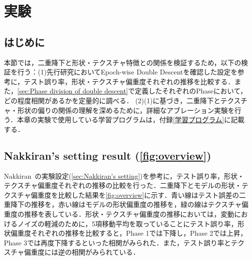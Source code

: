 \chapter{実験}
\section{はじめに}

本節では，二重降下と形状・テクスチャ特徴との関係を検証するため，以下の検証を行う：(1)先行研究においてEpoch-wise Double Descentを確認した設定を参考に，テスト誤り率，形状・テクスチャ偏重度それぞれの推移を比較する．また，\cref{sec:Phase division of double descent}で定義したそれぞれのPhaseにおいて，どの程度相関があるかを定量的に調べる． (2)(1)に基づき，二重降下とテクスチャ・形状の偏りの関係の理解を深めるために，詳細なアブレーション実験を行う．本章の実験で使用している学習プログラムは，付録\ref{学習プログラム}に記載する．

\section[Nakkiran's setting result]{Nakkiran's setting result (\cref{fig:overview})}

Nakkiran~\cite{nakkiran2021deep}の実験設定(\cref{sec:Nakkiran's setting})を参考に，テスト誤り率，形状・テクスチャ偏重度それぞれの推移の比較を行った．二重降下とモデルの形状・テクスチャ偏重度を比較した結果を\cref{fig:overview}に示す．青い線はテスト誤差の二重降下の推移を，赤い線はモデルの形状偏重度の推移を，緑の線はテクスチャ偏重度の推移を表している．形状・テクスチャ偏重度の推移においては，変動におけるノイズの軽減のために，5項移動平均を取っていることにテスト誤り率，形状偏重度それぞれの推移を比較すると，Phase 1では下降し，Phase 2では上昇，Phase 3では再度下降するといった相関がみられた．また，テスト誤り率とテクスチャ偏重度には逆の相関がみられている．

